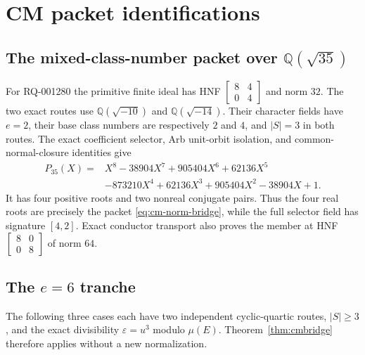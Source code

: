 \documentclass[11pt]{article}
\newcommand{\Q}{\mathbb Q}
\begin{document}
\section{CM packet identifications}\label{sec:cmcases}

\subsection{The mixed-class-number packet over
\texorpdfstring{\(\Q(\sqrt{35})\)}{Q(sqrt(35))}}

For RQ-001280 the primitive finite ideal has HNF
\(\left[\begin{smallmatrix}8&4\\0&4\end{smallmatrix}\right]\)
and norm \(32\).  The two exact routes use
\(\Q(\sqrt{-10})\) and \(\Q(\sqrt{-14})\).  Their character fields
have \(e=2\), their base class numbers are respectively \(2\) and
\(4\), and \(|S|=3\) in both routes.  The exact coefficient selector,
Arb unit-orbit isolation, and common-normal-closure identities give
\begin{equation}\label{eq:packet-q35}
\begin{aligned}
P_{35}(X)={}&X^8-38904X^7+905404X^6+62136X^5\\
&-873210X^4+62136X^3+905404X^2-38904X+1.
\end{aligned}
\end{equation}
It has four positive roots and two nonreal conjugate pairs.  Thus the
four real roots are precisely the packet
\eqref{eq:cm-norm-bridge}, while the full
selector field has signature \([4,2]\).  Exact conductor transport
also proves the member at HNF
\(\left[\begin{smallmatrix}8&0\\0&8\end{smallmatrix}\right]\)
of norm \(64\).

\subsection{\texorpdfstring{The \(e=6\) tranche}{The e=6 tranche}}

The following three cases each have two independent cyclic-quartic
routes, \(|S|\ge3\), and the exact divisibility
\(\varepsilon=u^3\) modulo \(\mu(E)\).  Theorem~\ref{thm:cmbridge}
therefore applies without a new normalization.
\end{document}
